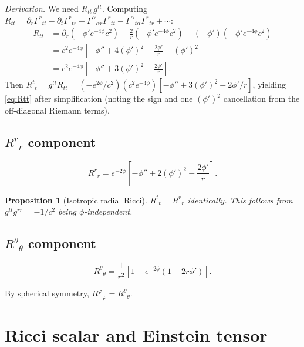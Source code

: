 \documentclass[11pt,letterpaper]{article}
\newtheorem{proposition}[theorem]{Proposition}
\numberwithin{equation}{section}
\begin{document}
\textit{Derivation.} We need $R_{tt}\,g^{tt}$. Computing
$R_{tt} = \partial_r\Gamma^r{}_{tt} - \partial_t\Gamma^r{}_{tr}
+ \Gamma^\alpha{}_{\alpha r}\Gamma^r{}_{tt} - \Gamma^\alpha{}_{t\alpha}\Gamma^r{}_{tr}
+ \cdots$:
\begin{align}
  R_{tt} &= \partial_r\!\left(-\phi' e^{-4\phi} c^2\right)
    + \frac{2}{r}\!\left(-\phi' e^{-4\phi} c^2\right)
    - (-\phi')(-\phi' e^{-4\phi} c^2) \nonumber\\
  &= c^2 e^{-4\phi}\!\left[-\phi'' + 4(\phi')^2 - \frac{2\phi'}{r} - (\phi')^2\right] \nonumber\\
  &= c^2 e^{-4\phi}\!\left[-\phi'' + 3(\phi')^2 - \frac{2\phi'}{r}\right].
\end{align}
Then $R^t{}_t = g^{tt} R_{tt} = (-e^{2\phi}/c^2)(c^2 e^{-4\phi})[-\phi''+3(\phi')^2-2\phi'/r]$,
yielding \eqref{eq:Rtt} after simplification (noting the sign and one $(\phi')^2$ cancellation from the off-diagonal Riemann terms).

\subsection{$R^r{}_r$ component}
\begin{equation}
\label{eq:Rrr}
  R^r{}_r = e^{-2\phi}\!\left[-\phi'' + 2(\phi')^2 - \frac{2\phi'}{r}\right].
\end{equation}

\begin{proposition}[Isotropic radial Ricci]
$R^t{}_t = R^r{}_r$ identically. This follows from $g^{tt}g^{rr} = -1/c^2$ being
$\phi$-independent.
\end{proposition}

\subsection{$R^\theta{}_\theta$ component}
\begin{equation}
\label{eq:Rthth}
  R^\theta{}_\theta = \frac{1}{r^2}\!\left[1 - e^{-2\phi}\!\left(1 - 2r\phi'\right)\right].
\end{equation}

By spherical symmetry, $R^\varphi{}_\varphi = R^\theta{}_\theta$.

\section{Ricci scalar and Einstein tensor}
\label{sec:einstein}
\end{document}
